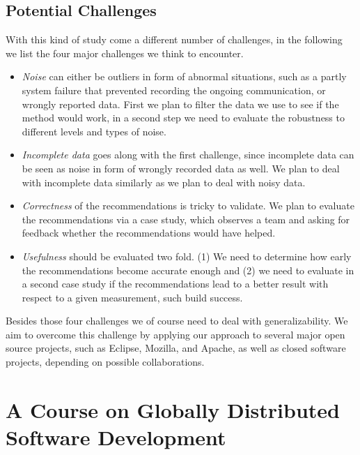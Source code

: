 \subsection{Potential Challenges}
With this kind of study come a different number of challenges, in the following we list the four major challenges we think to encounter.
\begin{itemize}
\item \emph{Noise} can either be outliers in form of abnormal situations, such as a partly system failure that prevented recording the ongoing communication, or wrongly reported data.
First we plan to filter the data we use to see if the method would work, in a second step we need to evaluate the robustness to different levels and types of noise.
\item \emph{Incomplete data} goes along with the first challenge, since incomplete data can be seen as noise in form of wrongly recorded data as well.
We plan to deal with incomplete data similarly as we plan to deal with noisy data.
\item \emph{Correctness} of the recommendations is tricky to validate.
We plan to evaluate the recommendations via a case study, which observes a team and asking for feedback whether the recommendations would have helped. 
\item \emph{Usefulness} should be evaluated two fold. (1) We need to determine how early the recommendations become accurate enough and (2) we need to evaluate in a second case study if the recommendations lead to a better result with respect to a given measurement, such build success.
\end{itemize}
Besides those four challenges we of course need to deal with generalizability.
We aim to overcome this challenge by applying our approach to several major open source projects, such as Eclipse, Mozilla, and Apache, as well as closed software projects, depending on possible collaborations.



\section{A Course on Globally Distributed Software Development}
